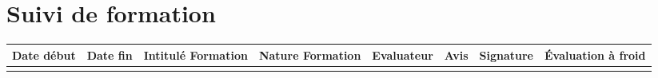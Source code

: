 \section*{\large Suivi de formation}

\begin{table}[H]
\centering
	\begin{tabularx}{16.8cm}{|X|X|X|X|X|X|X|X|}
	\hline
	\rowcolor[gray]{0.85} \small Date début & \small Date fin & \small Intitulé Formation & \small Nature Formation & \small Evaluateur & \small Avis & \small Signature & \small Évaluation à froid \\
	\hline
	 & & & & & & & \\
	\hline
	\end{tabularx}
\end{table}

